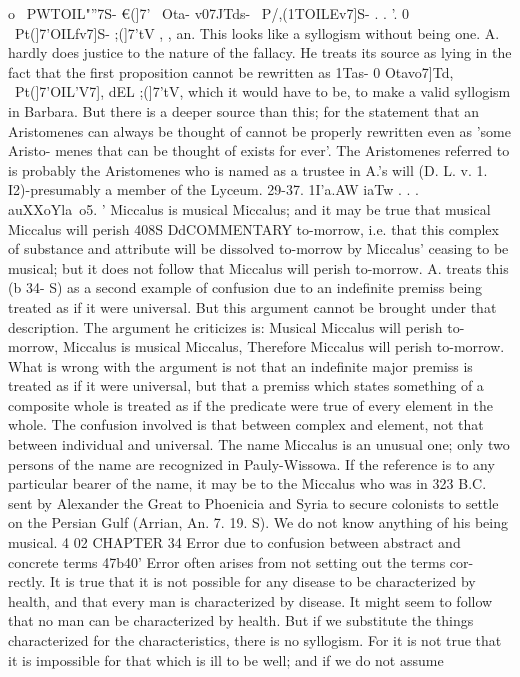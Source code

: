 {{{{{{{{{{{{{{{{{{{{{{{{{{{o ~PWTOIL"''7}S- €(]7'~ Ota-
v07JTds- ~P/,(1TOILEv7]S- .
. '. 0 ~Pt(]7'OILfv7]S- ;(]7'tV
, ,
an.
This looks like a syllogism without being one. A. hardly does
justice to the nature of the fallacy. He treats its source as lying
in the fact that the first proposition cannot be rewritten as
1Tas- 0 Otavo7]Td, ~Pt(]7'OIL'V7], dEL ;(]7'tV, which it would have to be,
to make a valid syllogism in Barbara. But there is a deeper source
than this; for the statement that an Aristomenes can always be
thought of cannot be properly rewritten even as 'some Aristo-
menes that can be thought of exists for ever'.
The Aristomenes referred to is probably the Aristomenes who
is named as a trustee in A.'s will (D. L. v. 1. I2)-presumably a
member of the Lyceum.
29-37. 1I'a.AW iaTw . . . auXXoYla~o5. ' Miccalus is musical
Miccalus; and it may be true that musical Miccalus will perish
408S
DdCOMMENTARY
to-morrow, i.e. that this complex of substance and attribute will
be dissolved to-morrow by Miccalus' ceasing to be musical; but
it does not follow that Miccalus will perish to-morrow. A. treats
this (b 34- S) as a second example of confusion due to an indefinite
premiss being treated as if it were universal. But this argument
cannot be brought under that description. The argument he
criticizes is: Musical Miccalus will perish to-morrow, Miccalus
is musical Miccalus, Therefore Miccalus will perish to-morrow.
What is wrong with the argument is not that an indefinite major
premiss is treated as if it were universal, but that a premiss which
states something of a composite whole is treated as if the predicate
were true of every element in the whole. The confusion involved
is that between complex and element, not that between individual
and universal.
The name Miccalus is an unusual one; only two persons of the
name are recognized in Pauly-Wissowa. If the reference is to
any particular bearer of the name, it may be to the Miccalus who
was in 323 B.C. sent by Alexander the Great to Phoenicia and
Syria to secure colonists to settle on the Persian Gulf (Arrian,
An. 7. 19. S). We do not know anything of his being musical.
4 02
CHAPTER 34
Error due to confusion between abstract and concrete terms
47b40' Error often arises from not setting out the terms cor-
rectly. It is true that it is not possible for any disease to be
characterized by health, and that every man is characterized by
disease. It might seem to follow that no man can be characterized
by health. But if we substitute the things characterized for the
characteristics, there is no syllogism. For it is not true that it is
impossible for that which is ill to be well; and if we do not assume
}}}}}}}}}}}}}}}}}}}}}}}}}}
